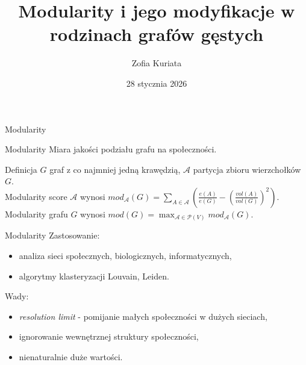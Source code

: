 \documentclass{beamer}
\title{Modularity i jego modyfikacje w rodzinach grafów gęstych}
\author{Zofia Kuriata}
\institute{Politechnika Wrocławska}
\date{28 stycznia 2026}
\begin{document}
\begin{frame}
    \titlepage
\end{frame}

\begin{frame}{Modularity}
    \begin{block}{Modularity}
        Miara jakości podziału grafu na społeczności.
    \end{block}
    \vspace{0.5cm}
    \begin{block}{Definicja}
        \(G\) graf z co najmniej jedną krawędzią, \(\mathcal{A}\) partycja zbioru wierzchołków \(G\).\\
        \vspace{0.4cm}
        Modularity score \(\mathcal{A}\) wynosi \(mod_{\mathcal{A}}(G) = \sum_{A \in \mathcal{A}} \left(\frac{e(A)}{e(G)} - {\left(\frac{vol(A)}{vol(G)}\right)}^2\right).\)\\
        \vspace{0.4cm}
        Modularity grafu \(G\) wynosi \(mod(G) = \max_{\mathcal{A} \in \mathcal{P}(V)} mod_{\mathcal{A}}(G).\)
    \end{block}

\end{frame}

\begin{frame}{Modularity}
    Zastosowanie:
    \begin{itemize}
        \item analiza sieci społecznych, biologicznych, informatycznych,
        \item algorytmy klasteryzacji Louvain, Leiden.\\
    \end{itemize}
    \vspace{0.2cm}
    Wady:
    \begin{itemize}
        \item \textit{resolution limit} - pomijanie małych społeczności w dużych sieciach,
        \item ignorowanie wewnętrznej struktury społeczności,
        \item nienaturalnie duże wartości.\\
    \end{itemize}
\end{frame}
\end{document}
